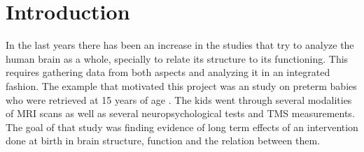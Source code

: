 \documentclass[utf8,paper]{frontiersSCNS} %
\begin{document}




\section{Introduction}


In the last years there has been an increase in the studies that try to analyze the human brain as a whole, specially to relate its structure to its functioning. This requires gathering data from both aspects and analyzing it in an integrated fashion. The example that motivated this project was an study on preterm babies who were retrieved at 15 years of age \citep{schneider_cerebral_2012}. The kids went through several modalities of MRI scans as well as several neuropsychological tests and TMS measurements. The goal of that study was finding evidence of long term effects of an intervention done at birth in brain structure, function and the relation between them. 
\end{document}

